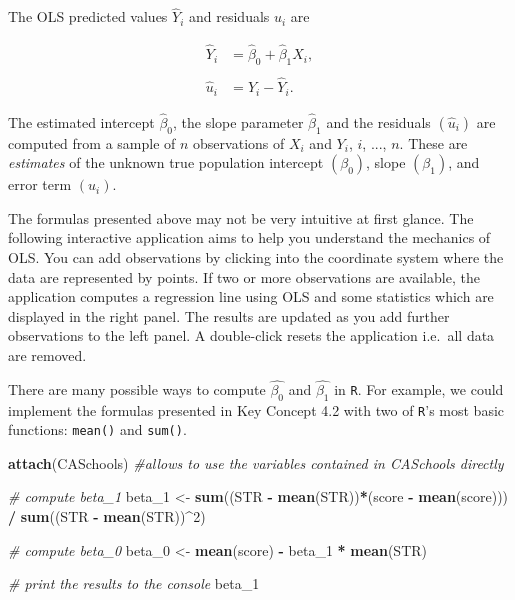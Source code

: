 \documentclass[]{book}
\newenvironment{Shaded}{\begin{snugshade}}{\end{snugshade}}
\newcommand{\KeywordTok}[1]{\textcolor[rgb]{0.13,0.29,0.53}{\textbf{#1}}}
\newcommand{\DecValTok}[1]{\textcolor[rgb]{0.00,0.00,0.81}{#1}}
\newcommand{\StringTok}[1]{\textcolor[rgb]{0.31,0.60,0.02}{#1}}
\newcommand{\CommentTok}[1]{\textcolor[rgb]{0.56,0.35,0.01}{\textit{#1}}}
\newcommand{\OperatorTok}[1]{\textcolor[rgb]{0.81,0.36,0.00}{\textbf{#1}}}
\newcommand{\NormalTok}[1]{#1}
\theoremstyle{definition}
\theoremstyle{definition}
\theoremstyle{definition}
\theoremstyle{remark}
\begin{document}
The OLS predicted values \(\widehat{Y}_i\) and residuals \(\hat{u}_i\)
are

\begin{align}
  \widehat{Y}_i & =  \hat\beta_0 + \hat\beta_1 X_i,\\
  \\
  \hat{u}_i & =  Y_i - \widehat{Y}_i. 
\end{align}

The estimated intercept \(\hat{\beta}_0\), the slope parameter
\(\hat{\beta}_1\) and the residuals \(\left(\hat{u}_i\right)\) are
computed from a sample of \(n\) observations of \(X_i\) and \(Y_i\),
\(i\), \(...\), \(n\). These are \emph{estimates} of the unknown true
population intercept \(\left(\beta_0 \right)\), slope
\(\left(\beta_1\right)\), and error term \((u_i)\).

The formulas presented above may not be very intuitive at first glance.
The following interactive application aims to help you understand the
mechanics of OLS. You can add observations by clicking into the
coordinate system where the data are represented by points. If two or
more observations are available, the application computes a regression
line using OLS and some statistics which are displayed in the right
panel. The results are updated as you add further observations to the
left panel. A double-click resets the application i.e.~all data are
removed.

There are many possible ways to compute \(\hat{\beta_0}\) and
\(\hat{\beta_1}\) in \texttt{R}. For example, we could implement the
formulas presented in Key Concept 4.2 with two of \texttt{R}'s most
basic functions: \texttt{mean()} and \texttt{sum()}.

\begin{Shaded}
\begin{Highlighting}[]
\KeywordTok{attach}\NormalTok{(CASchools) }\CommentTok{#allows to use the variables contained in CASchools directly}

\CommentTok{# compute beta_1 }
\NormalTok{beta_}\DecValTok{1}\NormalTok{ <-}\StringTok{ }\KeywordTok{sum}\NormalTok{((STR }\OperatorTok{-}\StringTok{ }\KeywordTok{mean}\NormalTok{(STR))}\OperatorTok{*}\NormalTok{(score }\OperatorTok{-}\StringTok{ }\KeywordTok{mean}\NormalTok{(score))) }\OperatorTok{/}\StringTok{ }\KeywordTok{sum}\NormalTok{((STR }\OperatorTok{-}\StringTok{ }\KeywordTok{mean}\NormalTok{(STR))}\OperatorTok{^}\DecValTok{2}\NormalTok{)}

\CommentTok{# compute beta_0}
\NormalTok{beta_}\DecValTok{0}\NormalTok{ <-}\StringTok{ }\KeywordTok{mean}\NormalTok{(score) }\OperatorTok{-}\StringTok{ }\NormalTok{beta_}\DecValTok{1} \OperatorTok{*}\StringTok{ }\KeywordTok{mean}\NormalTok{(STR)}

\CommentTok{# print the results to the console}
\NormalTok{beta_}\DecValTok{1}
\end{Highlighting}
\end{Shaded}
\end{document}
